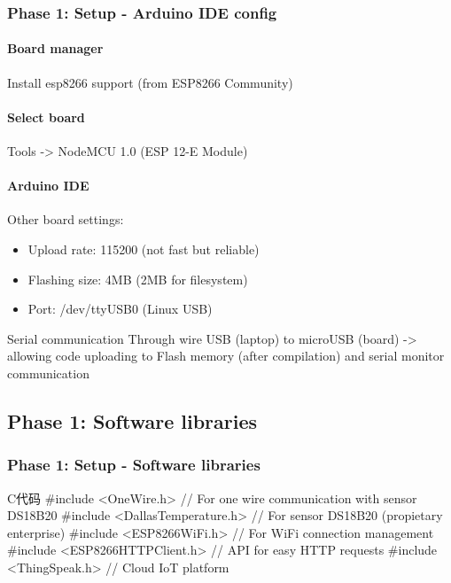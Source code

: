 \documentclass[
    aspectratio=169,                   %
]{beamer}
\begin{document}
    \begin{frame}
        \frametitle{Phase 1: Setup - Arduino IDE config}
        
        \paragraph{Board manager} Install \alert{esp8266} support (from ESP8266 Community)

        \paragraph{Select board} Tools -> NodeMCU 1.0 (ESP 12-E Module)

        \paragraph{Arduino IDE} Other board settings: 

        \begin{itemize}
            \item \alert{Upload rate}: 115200 (not fast but reliable)
            \item \alert{Flashing size}: 4MB (2MB for filesystem)
            \item \alert{Port}: /dev/ttyUSB0 (Linux USB)
        \end{itemize}

        \begin{block}{Serial communication}
            Through wire USB (laptop) to microUSB (board) -> allowing code uploading to Flash memory (after compilation) and serial monitor communication
        \end{block}
    \end{frame}

\subsection{Phase 1: Software libraries}

    \begin{frame}[fragile]          %
        \frametitle{Phase 1: Setup - Software libraries}
        \begin{codeblock}[language=c]{C代码}
#include <OneWire.h> // For one wire communication with sensor DS18B20
#include <DallasTemperature.h> // For sensor DS18B20 (propietary enterprise)
#include <ESP8266WiFi.h> // For WiFi connection management
#include <ESP8266HTTPClient.h> // API for easy HTTP requests
#include <ThingSpeak.h> // Cloud IoT platform
        \end{codeblock}
    \end{frame}
\end{document}
